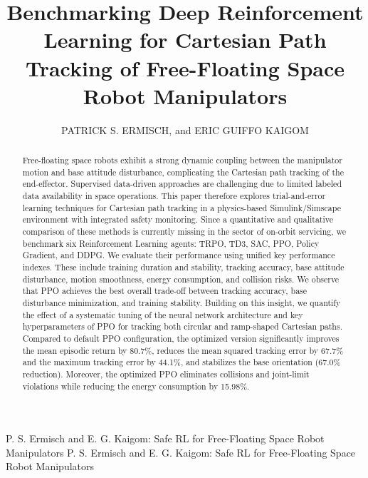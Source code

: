 \documentclass{ieeeaccess}
\begin{document}

\title{Benchmarking  Deep Reinforcement Learning for Cartesian Path Tracking  of Free-Floating Space Robot Manipulators}
\author{\uppercase{Patrick S. Ermisch}, and 
\uppercase{Eric Guiffo Kaigom} }
\address[1]{Department of Computer Science \& Engineering, Frankfurt University of Applied Sciences, Frankfurt am Main, Germany \\(e-mail: steven.ermisch@stud.fra-uas.de, kaigom@fra-uas.de)}

\markboth
{P. S. Ermisch and E. G. Kaigom: Safe RL for Free-Floating Space Robot Manipulators}
{P. S. Ermisch and E. G. Kaigom: Safe RL for Free-Floating Space Robot Manipulators}


\begin{abstract}
Free-floating space robots exhibit a strong dynamic coupling between the manipulator motion and base attitude disturbance, 
complicating the Cartesian path tracking of the end-effector. 
Supervised data-driven approaches are challenging due to limited labeled data availability in space operations.
This paper therefore explores trial-and-error learning techniques for Cartesian path tracking in a physics-based
Simulink/Simscape environment with integrated safety monitoring. Since a quantitative and qualitative comparison of these methods is currently 
missing in the sector of on-orbit servicing, we benchmark six Reinforcement Learning agents: TRPO, TD3, SAC, PPO,
Policy Gradient, and DDPG. We evaluate their performance using unified key performance indexes. These include training duration and stability, tracking accuracy, base attitude disturbance, motion smoothness, energy consumption, and collision risks. We observe that PPO achieves the best overall trade-off between tracking accuracy, base disturbance minimization, and training stability.
Building on this insight, we quantify the effect of a systematic tuning of the neural network architecture and key hyperparameters of PPO for tracking 
both circular and ramp-shaped Cartesian paths.
Compared to default PPO configuration, the optimized version significantly improves the mean episodic return by 80.7\%,
reduces the mean squared tracking error by 67.7\% and the maximum tracking error by 44.1\%, and stabilizes
the base orientation (67.0\% reduction). Moreover, the optimized PPO eliminates collisions and joint-limit
violations while reducing the energy consumption by 15.98\%.
\end{abstract}
\end{document}
